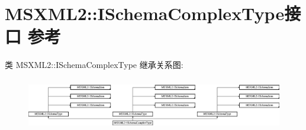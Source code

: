 \hypertarget{interface_m_s_x_m_l2_1_1_i_schema_complex_type}{}\section{M\+S\+X\+M\+L2\+:\+:I\+Schema\+Complex\+Type接口 参考}
\label{interface_m_s_x_m_l2_1_1_i_schema_complex_type}
类 M\+S\+X\+M\+L2\+:\+:I\+Schema\+Complex\+Type 继承关系图\+:\begin{figure}[H]
\begin{center}
\leavevmode
\includegraphics[height=2.298851cm]{interface_m_s_x_m_l2_1_1_i_schema_complex_type}
\end{center}
\end{figure}
